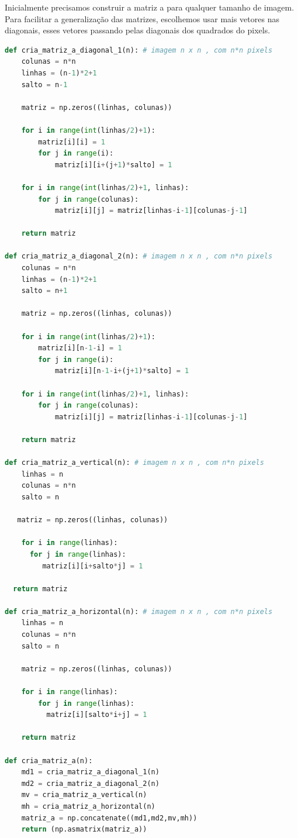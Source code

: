 \documentclass[a4paper, 12pt]{article}
\begin{document}
Inicialmente precisamos construir a matriz a para qualquer tamanho de imagem. Para facilitar a generalização das matrizes, escolhemos usar mais vetores nas diagonais, esses vetores passando pelas diagonais dos quadrados do pixels.

\begin{lstlisting}[language=Python, caption=Matriz a, label=Matriz a]
def cria_matriz_a_diagonal_1(n): # imagem n x n , com n*n pixels
    colunas = n*n
    linhas = (n-1)*2+1
    salto = n-1

    matriz = np.zeros((linhas, colunas))

    for i in range(int(linhas/2)+1):
        matriz[i][i] = 1
        for j in range(i):
            matriz[i][i+(j+1)*salto] = 1
  
    for i in range(int(linhas/2)+1, linhas):
        for j in range(colunas):
            matriz[i][j] = matriz[linhas-i-1][colunas-j-1]

    return matriz
  
def cria_matriz_a_diagonal_2(n): # imagem n x n , com n*n pixels
    colunas = n*n
    linhas = (n-1)*2+1
    salto = n+1

    matriz = np.zeros((linhas, colunas))

    for i in range(int(linhas/2)+1):
        matriz[i][n-1-i] = 1
        for j in range(i):
            matriz[i][n-1-i+(j+1)*salto] = 1
  
    for i in range(int(linhas/2)+1, linhas):
        for j in range(colunas):
            matriz[i][j] = matriz[linhas-i-1][colunas-j-1]

    return matriz
  
def cria_matriz_a_vertical(n): # imagem n x n , com n*n pixels
    linhas = n
    colunas = n*n
    salto = n

   matriz = np.zeros((linhas, colunas))

    for i in range(linhas):
      for j in range(linhas):
         matriz[i][i+salto*j] = 1
  
  return matriz
  
def cria_matriz_a_horizontal(n): # imagem n x n , com n*n pixels
    linhas = n
    colunas = n*n
    salto = n

    matriz = np.zeros((linhas, colunas))
    
    for i in range(linhas):
        for j in range(linhas):
          matriz[i][salto*i+j] = 1

    return matriz
  
def cria_matriz_a(n):
    md1 = cria_matriz_a_diagonal_1(n)
    md2 = cria_matriz_a_diagonal_2(n)
    mv = cria_matriz_a_vertical(n)
    mh = cria_matriz_a_horizontal(n)
    matriz_a = np.concatenate((md1,md2,mv,mh))
    return (np.asmatrix(matriz_a))
\end{lstlisting}
\end{document}
